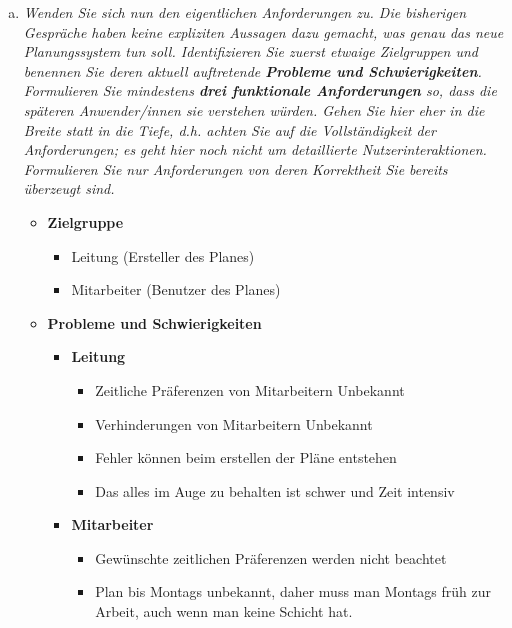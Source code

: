 \begin{enumerate} [a)]
    \item {\itshape Wenden Sie sich nun den eigentlichen Anforderungen zu. Die bisherigen Gespräche haben keine expliziten Aussagen dazu gemacht, was genau das neue Planungssystem tun soll. Identifizieren Sie zuerst etwaige Zielgruppen und benennen Sie deren aktuell auftretende \textbf{Probleme und Schwierigkeiten}. Formulieren Sie mindestens \textbf{drei funktionale Anforderungen} so, dass die späteren Anwender/innen sie verstehen würden. Gehen Sie hier eher in die Breite statt in die Tiefe, d.h. achten Sie auf die Vollständigkeit der Anforderungen; es geht hier noch nicht um detaillierte Nutzerinteraktionen. Formulieren Sie nur Anforderungen von deren Korrektheit Sie bereits überzeugt sind.}
    \begin{itemize}
        \item \textbf{Zielgruppe}
        \begin{itemize}
            \item Leitung (Ersteller des Planes)
            \item Mitarbeiter (Benutzer des Planes)
        \end{itemize}
        \item \textbf{Probleme und Schwierigkeiten}
        \begin{itemize}
            \item \textbf{Leitung}
            \begin{itemize}
                \item Zeitliche Präferenzen von Mitarbeitern Unbekannt
                \item Verhinderungen von Mitarbeitern Unbekannt
                \item Fehler können beim erstellen der Pläne entstehen
                \item Das alles im Auge zu behalten ist schwer und Zeit intensiv
            \end{itemize}
            \item \textbf{Mitarbeiter}
            \begin{itemize}
                \item Gewünschte zeitlichen Präferenzen werden nicht beachtet
                \item Plan bis Montags unbekannt, daher muss man Montags früh zur Arbeit, auch wenn man keine Schicht hat.
            \end{itemize}
        \end{itemize}

\end{itemize}
\end{enumerate}
